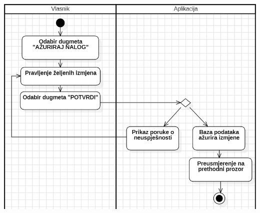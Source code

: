 \documentclass{scrreprt}
\begin{document}
\begin{center}
	\includegraphics[width=14cm]{./img/05.png}
\end{center}

\pagebreak
\end{document}
